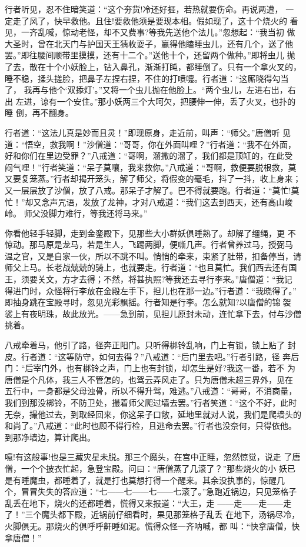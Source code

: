行者听见，忍不住暗笑道：“这个夯货!冷还好捱，若热就要伤命。再说两遭，
一定走了风了，快早救他。且住!要救他须是要现本相。假如现了，这十个烧火的
看见，一齐乱喊，惊动老怪，却不又费事?等我先送他个法儿。”忽想起：“我当初
做大圣时，曾在北天门与护国天王猜枚耍子，赢得他瞌睡虫儿，还有几个，送了他
罢。”即往腰间顺带里摸摸，还有十二个。”送他十个，还留两个做种。”即将虫儿
抛了去，散在十个小妖脸上，钻入鼻孔，渐渐打盹，都睡倒了。只有一个拿火叉的，
睡不稳，揉头搓脸，把鼻子左捏右捏，不住的打喷嚏。行者道：“这厮晓得勾当了，
我再与他个‘双掭灯’。”又将一个虫儿抛在他脸上。“两个虫儿，左进右出，右出
左进，谅有一个安住。”那小妖两三个大呵欠，把腰伸一伸，丢了火叉，也扑的睡
倒，再不翻身。

行者道：“这法儿真是妙而且灵！”即现原身，走近前，叫声：“师父。”唐僧听
见道：“悟空，救我啊！”沙僧道：“哥哥，你在外面叫哩？”行者道：“我不在外面，
好和你们在里边受罪？”八戒道：“哥啊，溜撒的溜了，我们都是顶缸的，在此受
闷气哩！”行者笑道：“呆子莫嚷，我来救你。”八戒道：“哥啊，救便要脱根救，莫
又要复笼蒸。”行者却揭开笼头，解了师父，将假变的毫毛，抖了一抖，收上身来；
又一层层放了沙僧，放了八戒。那呆子才解了。巴不得就要跑。行者道：“莫忙!莫
忙！”却又念声咒语，发放了龙神，才对八戒道：“我们这去到西天，还有高山峻岭。
师父没脚力难行，等我还将马来。”

你看他轻手轻脚，走到金銮殿下，见那些大小群妖俱睡熟了。却解了缰绳，更
不惊动。那马原是龙马，若是生人，飞踢两脚，便嘶几声。行者曾养过马，授弼马
温之官，又是自家一伙，所以不跳不叫。悄悄的牵来，束紧了肚带，扣备停当，请
师父上马。长老战兢兢的骑上，也就要走。行者道：“也且莫忙。我们西去还有国
王，须要关文，方才去得；不然，将甚执照?等我还去寻行李来。”唐僧道：“我记
得进门时，众怪将行李放在金殿左手下，担儿也在那一边。”行者道：“我晓得了。”
即抽身跳在宝殿寻时，忽见光彩飘摇。行者知是行李。怎么就知?以唐僧的锦袈
裟上有夜明珠，故此放光。——急到前，见担儿原封未动，连忙拿下去，付与沙僧
挑着。

八戒牵着马，他引了路，径奔正阳门。只听得梆铃乱响，门上有锁，锁上贴了
封皮。行者道：“这等防守，如何去得？”八戒道：“后门里去吧。”行者引路，径
奔后门：“后宰门外，也有梆铃之声，门上也有封锁，却怎生是好?我这一番，若不
为唐僧是个凡体，我三人不管怎的，也驾云弄风走了。只为唐僧未超三界外，见在
五行中，一身都是父母浊骨，所以不得升驾，难逃。”八戒道：“哥哥，不消商量，
我们到那没梆铃，不防卫处，撮着师父爬过墙去罢。”行者笑道：“这个不好，此时
无奈，撮他过去，到取经回来，你这呆子口敞，延地里就对人说，我们是爬墙头的
和尚了。”八戒道：“此时也顾不得行检，且逃命去罢。”行者也没奈何，只得依他。
到那净墙边，算计爬出。

噫!有这般事!也是三藏灾星未脱。那三个魔头，在宫中正睡，忽然惊觉，说走
了唐僧，一个个披衣忙起，急登宝殿。问曰：“唐僧蒸了几滚了？”那些烧火的小
妖已是有睡魔虫，都睡着了，就是打也莫想打得一个醒来。其余没执事的，惊醒几
个，冒冒失失的答应道：“七——七——七——七滚了。”急跑近锅边，只见笼格子
乱丢在地下，烧火的还都睡着，慌得又来报道：“大王，走
——走——走——走了！”三个魔头都下殿，近锅前仔细看时，果见那笼格子乱丢
在地下，汤锅尽冷，火脚俱无。那烧火的俱呼呼鼾睡如泥。慌得众怪一齐呐喊，都
叫：“快拿唐僧，快拿唐僧！”

